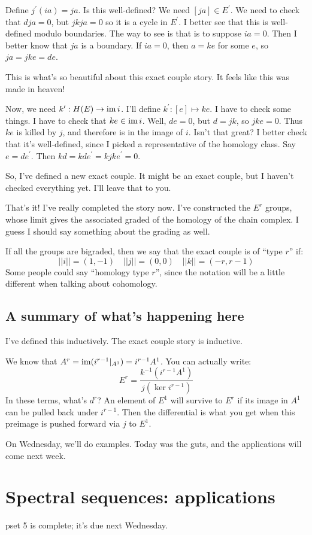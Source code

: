 Define $j^\prime(ia) = ja$.
Is this well-defined? We need $[ja] \in E^\prime$.
We need to check that $dja = 0$, but $jkja = 0$ so it is a cycle in $E^\prime$.
I better see that this is well-defined modulo boundaries.
The way to see is that is to suppose $ia = 0$.
Then I better know that $ja$ is a boundary.
If $ia = 0$, then $a = ke$ for some $e$, so $ja = jke = de$.

This is what's so beautiful about this exact couple story.
It feels like this was made in heaven!

Now, we need $k^\prime:H(E) \to \operatorname{im} i$.
I'll define $k^\prime:[e]\mapsto ke$.
I have to check some things.
I have to check that $ke\in\operatorname{im} i$.
Well, $de = 0$, but $d = jk$, so $jke = 0$.
Thus $ke$ is killed by $j$, and therefore is in the image of $i$.
Isn't that great?
I better check that it's well-defined, since I picked a representative of the homology class.
Say $e = de^\prime$.
Then $kd = kd e^\prime = kjke^\prime = 0$.

So, I've defined a new exact couple.
It might be an exact couple, but I haven't checked everything yet.
I'll leave that to you.

That's it!
I've really completed the story now.
I've constructed the $E^r$ groups, whose limit gives the associated graded of the homology of the chain complex.
I guess I should say something about the grading as well.

If all the groups are bigraded, then we say that the exact couple is of ``type $r$'' if:
$$
||i|| = (1,-1)\quad ||j|| = (0,0) \quad ||k|| = (-r,r-1)
$$
Some people could say ``homology type $r$'', since the notation will be a little different when talking about cohomology.

\subsection{A summary of what's happening here}
I've defined this inductively.
The exact couple story is inductive.

We know that $A^r = \operatorname{im}(i^{r-1}|_{A^1}) = i^{r-1} A^1$.
You can actually write:
$$
E^r = \frac{k^{-1}(i^{r-1}A^1)}{j(\ker i^{r-1})}
$$
In these terms, what's $d^r$?
An element of $E^1$ will survive to $E^r$ if its image in $A^1$ can be pulled back under $i^{r-1}$.
Then the differential is what you get when this preimage is pushed forward via $j$ to $E^1$.

On Wednesday, we'll do examples.
Today was the guts, and the applications will come next week.
\section{Spectral sequences: applications}
pset 5 is complete; it's due next Wednesday.


